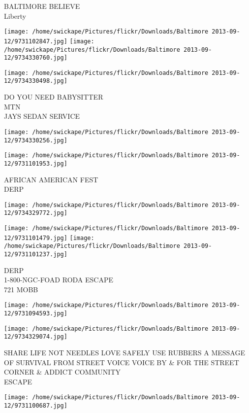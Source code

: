 \documentclass[10pt,letterpaper]{article}
\begin{document}
BALTIMORE BELIEVE\\
Liberty
\pagebreak

\texttt{[image: /home/swickape/Pictures/flickr/Downloads/Baltimore 2013-09-12/9731102847.jpg]}
\texttt{[image: /home/swickape/Pictures/flickr/Downloads/Baltimore 2013-09-12/9734330760.jpg]}

\vspace{0.25in}
\texttt{[image: /home/swickape/Pictures/flickr/Downloads/Baltimore 2013-09-12/9734330498.jpg]}

DO YOU NEED BABYSITTER\\
MTN\\
JAYS SEDAN SERVICE
\pagebreak

\texttt{[image: /home/swickape/Pictures/flickr/Downloads/Baltimore 2013-09-12/9734330256.jpg]}

\vspace{0.25in}
\texttt{[image: /home/swickape/Pictures/flickr/Downloads/Baltimore 2013-09-12/9731101953.jpg]}

AFRICAN AMERICAN FEST\\
DERP
\pagebreak

\texttt{[image: /home/swickape/Pictures/flickr/Downloads/Baltimore 2013-09-12/9734329772.jpg]}

\vspace{0.25in}
\texttt{[image: /home/swickape/Pictures/flickr/Downloads/Baltimore 2013-09-12/9731101479.jpg]}
\texttt{[image: /home/swickape/Pictures/flickr/Downloads/Baltimore 2013-09-12/9731101237.jpg]}

DERP\\
1{-}800{-}NGC{-}FOAD RODA ESCAPE\\
721 MOBB
\pagebreak

\texttt{[image: /home/swickape/Pictures/flickr/Downloads/Baltimore 2013-09-12/9731094593.jpg]}

\vspace{0.25in}
\texttt{[image: /home/swickape/Pictures/flickr/Downloads/Baltimore 2013-09-12/9734329074.jpg]}

SHARE LIFE NOT NEEDLES LOVE SAFELY USE RUBBERS A MESSAGE OF SURVIVAL FROM STREET VOICE VOICE BY \& FOR THE STREET CORNER \& ADDICT COMMUNITY\\
ESCAPE
\pagebreak

\texttt{[image: /home/swickape/Pictures/flickr/Downloads/Baltimore 2013-09-12/9731100687.jpg]}
\end{document}
